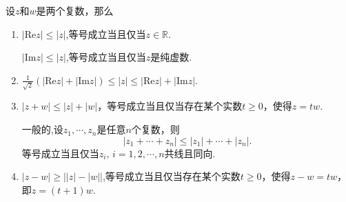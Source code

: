 \documentclass[../../main.tex]{subfiles}%
\begin{document}
\begin{proposition}[基本不等式]\label{proposition:复数基本不等式}
设\(z\)和\(w\)是两个复数，那么
\begin{enumerate}[(1)]
\item\label{proposition:复数基本不等式-1} \(|\mathrm{Re}z| \leqslant |z|\),等号成立当且仅当$z\in \mathbb{R}$.

\(|\mathrm{Im}z| \leqslant |z|\),等号成立当且仅当$z$是纯虚数.

\item $\frac{1}{\sqrt{2}}\left( \left| \mathrm{Re}z \right|+\left| \mathrm{Im}z \right| \right) \leqslant \left| z \right|\leqslant \left| \mathrm{Re}z \right|+\left| \mathrm{Im}z \right|.$

\item\label{proposition:复数基本不等式-2} \(|z + w| \leqslant |z| + |w|\)，等号成立当且仅当存在某个实数\(t \geqslant 0\)，使得\(z = tw\).

一般的,设\(z_1, \cdots, z_n\)是任意\(n\)个复数，则
\[
|z_1 + \cdots + z_n| \leqslant |z_1| + \cdots + |z_n|.
\]
等号成立当且仅当$z_i,\,i=1,2,\cdots,n$共线且同向.

\item\label{proposition:复数基本不等式-3} \(|z - w| \geqslant \big||z| - |w|\big|\),等号成立当且仅当存在某个实数\(t \geqslant 0\)，使得\(z - w = tw\)，即\(z = (t + 1)w\).
\end{enumerate}
\end{proposition}
\end{document}
